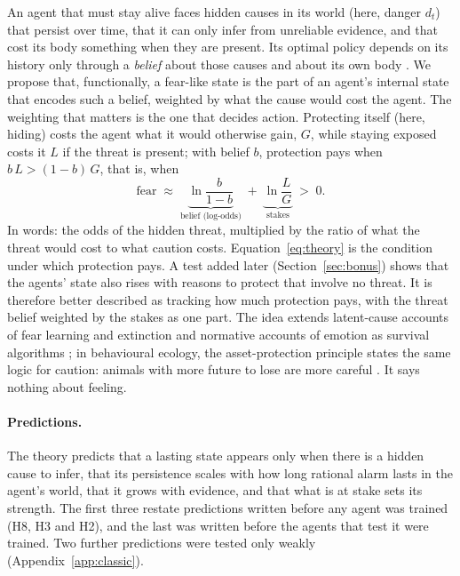 \documentclass[11pt]{article}
\begin{document}
An agent that must stay alive faces hidden causes in its world (here, danger $d_t$) that persist over time, that it can only infer from unreliable evidence, and that cost its body something when they are present. Its optimal policy depends on its history only through a \emph{belief} about those causes and about its own body \cite{bach2017algorithms}. We propose that, functionally, a fear-like state is the part of an agent's internal state that encodes such a belief, weighted by what the cause would cost the agent. The weighting that matters is the one that decides action. Protecting itself (here, hiding) costs the agent what it would otherwise gain, $G$, while staying exposed costs it $L$ if the threat is present; with belief $b$, protection pays when $b\,L>(1-b)\,G$, that is, when
\begin{equation}
\text{fear} \;\approx\; \underbrace{\ln\frac{b}{1-b}}_{\text{belief (log-odds)}} \;+\; \underbrace{\ln\frac{L}{G}}_{\text{stakes}} \;>\; 0 .
\label{eq:theory}
\end{equation}
In words: the odds of the hidden threat, multiplied by the ratio of what the threat would cost to what caution costs. Equation~\ref{eq:theory} is the condition under which protection pays. A test added later (Section~\ref{sec:bonus}) shows that the agents' state also rises with reasons to protect that involve no threat. It is therefore better described as tracking how much protection pays, with the threat belief weighted by the stakes as one part.
The idea extends latent-cause accounts of fear learning and extinction \cite{gershman2010context} and normative accounts of emotion as survival algorithms \cite{bach2017algorithms}; in behavioural ecology, the asset-protection principle states the same logic for caution: animals with more future to lose are more careful \cite{clark1994asset}. It says nothing about feeling.

\paragraph{Predictions.} The theory predicts that a lasting state appears only when there is a hidden cause to infer, that its persistence scales with how long rational alarm lasts in the agent's world, that it grows with evidence, and that what is at stake sets its strength. The first three restate predictions written before any agent was trained (H8, H3 and H2), and the last was written before the agents that test it were trained. Two further predictions were tested only weakly (Appendix~\ref{app:classic}).
\end{document}
